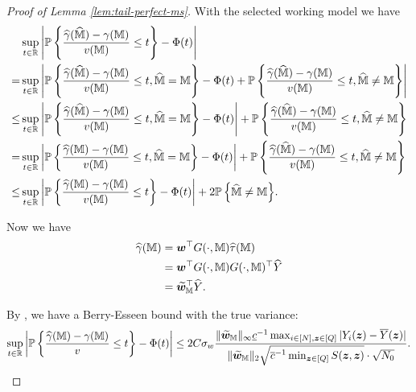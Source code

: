 \documentclass[12pt]{article}
\begin{document}
{
\begin{proof}[Proof of Lemma \ref{lem:tail-perfect-ms}]
With the selected working model we have
\begin{align*}
    &\sup_{t\in\bbR}\lt|\Prob{\frac{\hgamma(\hat{\bbM})-\gamma(\bbM)}{v(\bbM)} \le t} - \Phi(t)\rt| \\
    = &\sup_{t\in\bbR}\lt|\Prob{\frac{\hgamma(\hat{\bbM})-\gamma(\bbM)}{v(\bbM)} \le t, \hat{\bbM} = \bbM} - \Phi(t) + \Prob{\frac{\hgamma(\hat{\bbM})-\gamma(\bbM)}{v(\bbM)} \le t, \hat{\bbM} \neq \bbM} \rt|\\
    \le &\sup_{t\in\bbR}\lt|\Prob{\frac{\hgamma(\hat{\bbM})-\gamma(\bbM)}{v(\bbM)} \le t, \hat{\bbM} = \bbM} - \Phi(t)\rt| +  \Prob{\frac{\hgamma(\hat{\bbM})-\gamma(\bbM)}{v(\bbM)} \le t, \hat{\bbM} \neq \bbM}  \\
    = &\sup_{t\in\bbR}\lt|\Prob{\frac{\hgamma({\bbM})-\gamma(\bbM)}{v(\bbM)} \le t, \hat{\bbM} = \bbM} - \Phi(t)\rt| +  \Prob{\frac{\hgamma(\hat{\bbM})-\gamma(\bbM)}{v(\bbM)} \le t, \hat{\bbM} \neq \bbM}  \\
    \le & \sup_{t\in\bbR}\lt|\Prob{\frac{\hgamma({\bbM})-\gamma(\bbM)}{v(\bbM)} \le t} - \Phi(t)\rt| +  2\Prob{ \hat{\bbM} \neq \bbM}.
\end{align*}

Now we have 
\begin{align*}
    \hgamma(\bbM) &= \bw^\top G(\cdot, \bbM) \htau(\bbM) \\
    & =  \bw^\top G(\cdot, \bbM) G(\cdot, \bbM)^\top \hY \\
    & = \tilde{\bw}_{\bbM}^\top \hY.
\end{align*}


By ,  we have a Berry-Esseen bound with the true variance:
\begin{align*}
    \sup_{t\in\bbR}\lt|\Prob{\frac{\hgamma( {\bbM})-\gamma(\bbM)}{v} \le t} - \Phi(t)\rt| 
    \le  2C\sigma_w   \frac{\|\tilde{\bw}_{\bbM}\|_\infty\underline{c}^{-1} \max_{i\in[N],\bz\in[Q]}|Y_i(\bz)-\overline{Y}(\bz)|}{\|\tilde{\bw}_{\bbM} \|_2\sqrt{\overline{c}^{-1} \min_{\bz\in[Q]} S(\bz,\bz)}\cdot \sqrt{ N_0}}.  
\end{align*}
    
\end{proof}
}
\end{document}
